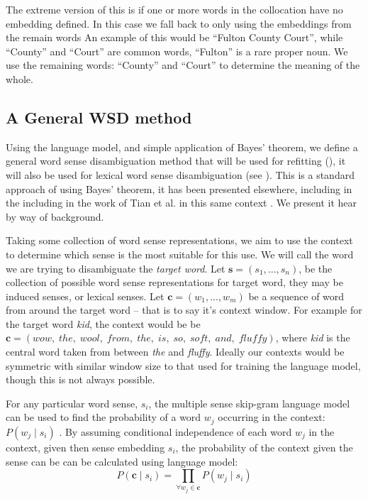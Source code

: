 \documentclass{sig-alternate}
\renewcommand{\c}{\mathbf{c}}
\newcommand{\s}{\mathbf{s}}
\begin{document}
The extreme version of this is if one or more words in the collocation have no embedding defined. In this case we fall back to only using the embeddings from the remain words An example of this would be ``Fulton County Court'', while ``County'' and ``Court'' are common words, ``Fulton'' is a rare proper noun. We use the remaining words: ``County'' and ``Court'' to determine the meaning of the whole.



\subsection{A General WSD method} \label{generalwsd}
Using the language model, and simple application of Bayes' theorem, we define a general word sense disambiguation method that will be used for refitting (), it will also be used for lexical word sense disambiguation (see ). This is a standard approach of using Bayes' theorem, it has been presented elsewhere, including in the including in the work of Tian et al. in this same context \parencite{tian2014probabilistic, AdaGrams}. We present it hear by way of background.

Taking some collection of word sense representations, we aim to use the context to determine which sense is the most suitable for this use.
We will call the word we are trying to disambiguate the \emph{target word}.
Let $\s=(s_{1},...,s_{n})$, be the collection of possible word sense representations for target word, they may be induced senses, or lexical senses.
Let $\c=(w_{1},...,w_{m})$ be a sequence of word from around the target word -- that is to say it's context window.
For example for the target word \emph{kid}, the context would be be {$\c=(wow,\; the,\; wool,\; from,\; the,\; is,\; so,\; soft,\; and,\; fluffy)$}, where \emph{kid} is the central word taken from between \emph{the} and \emph{fluffy}.
Ideally our contexts would be symmetric with similar window size to that used for training the language model, though this is not always possible.

For any particular word sense, $s_i$, the multiple sense skip-gram language model can be used to 
find the probability of a word $w_j$ occurring in the context: $P(w_j \mid s_i)$
\parencite{tian2014probabilistic,AdaGrams}.
By assuming conditional independence of each word $w_j$ in the context, given then sense embedding $s_i$, the probability of the context given the sense can be can be calculated using language model:
\begin{equation} \label{eq:contextprobtrue}
P(\c \mid s_{i})=\prod_{\forall w_{j}\in\c}P(w_{j} \mid s_{i})
\end{equation}
\end{document}
